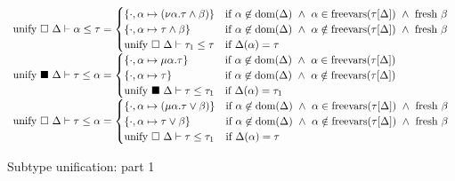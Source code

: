 \documentclass[sigplan,screen]{acmart}
\begin{document}
\begin{figure*}[h]
\[\begin{array}{l @{} l}
      \text{unify } \square\ \Delta \vdash \alpha \leq \tau	
      &{} =
      \begin{cases}  
        \{ \cdot,\alpha \mapsto (\nu\alpha.\tau \wedge \beta) \}
        & \text{if } 
        \alpha \not\in \text{dom}(\Delta) \ \wedge\
        \alpha \in \text{freevars}(\tau[\Delta]) \ \wedge\ 
        \text{fresh } \beta
        \\
        \{ \cdot,\alpha \mapsto \tau \wedge \beta \}
        & \text{if } 
        \alpha \not\in \text{dom}(\Delta) \ \wedge\
        \alpha \notin \text{freevars}(\tau[\Delta]) \ \wedge\ 
        \text{fresh } \beta
        \\
        \text{unify } \square\ \Delta \vdash \tau_1 \leq \tau
        &\text{if }
        \Delta(\alpha) = \tau
      \end{cases}
      \\
      \text{unify } \blacksquare\ \Delta \vdash \tau \leq \alpha 	
      &{} =
      \begin{cases}  
        \{ \cdot,\alpha \mapsto \mu\alpha.\tau \}
        & \text{if } 
        \alpha \not\in \text{dom}(\Delta) \ \wedge\
        \alpha \in \text{freevars}(\tau[\Delta])
        \\
        \{ \cdot,\alpha \mapsto \tau \}
        & \text{if } 
        \alpha \not\in \text{dom}(\Delta) \ \wedge\
        \alpha \notin \text{freevars}(\tau[\Delta])
        \\
        \text{unify } \blacksquare\ \Delta \vdash \tau \leq \tau_1
        &\text{if }
        \Delta(\alpha) = \tau_1
      \end{cases}
      \\
      \text{unify } \square\ \Delta \vdash \tau \leq \alpha	
      &{} =
      \begin{cases}  
        \{ \cdot,\alpha \mapsto (\mu\alpha.\tau \vee \beta) \}
        & \text{if } 
        \alpha \not\in \text{dom}(\Delta) \ \wedge\
        \alpha \in \text{freevars}(\tau[\Delta]) \ \wedge\ 
        \text{fresh } \beta
        \\
        \{ \cdot,\alpha \mapsto \tau \vee \beta \}
        & \text{if } 
        \alpha \not\in \text{dom}(\Delta) \ \wedge\
        \alpha \notin \text{freevars}(\tau[\Delta]) \ \wedge\ 
        \text{fresh } \beta
        \\
        \text{unify } \square\ \Delta \vdash \tau \leq \tau_1
        &\text{if }
        \Delta(\alpha) = \tau
      \end{cases}
    \end{array}
  \]
  \caption{Subtype unification: part 1}
\end{figure*}
\end{document}
